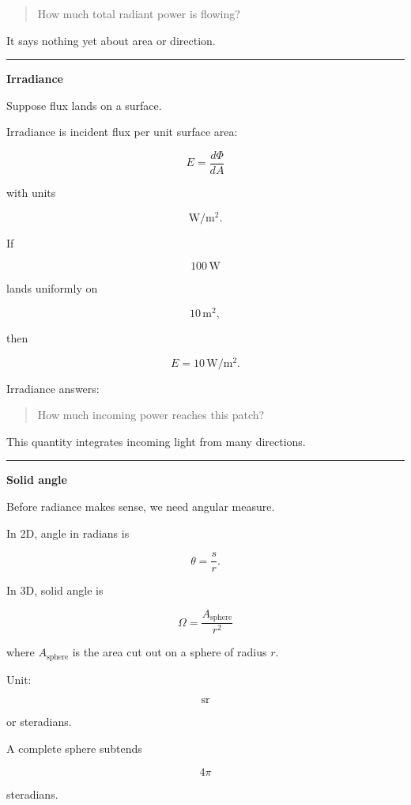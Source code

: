 \begin{quote}
How much total radiant power is flowing?
\end{quote}

It says nothing yet about area or direction.

\begin{center}\rule{0.5\linewidth}{0.5pt}\end{center}

\textbf{Irradiance}

Suppose flux lands on a surface.

Irradiance is incident flux per unit surface area:

\[
\boxed{
E=\frac{d\Phi}{dA}
}
\]

with units

\[
\mathrm{W/m^2}.
\]

If

\[
100\,\mathrm W
\]

lands uniformly on

\[
10\,\mathrm{m^2},
\]

then

\[
E=10\,\mathrm{W/m^2}.
\]

Irradiance answers:

\begin{quote}
How much incoming power reaches this patch?
\end{quote}

This quantity integrates incoming light from many directions.

\begin{center}\rule{0.5\linewidth}{0.5pt}\end{center}

\textbf{Solid angle}

Before radiance makes sense, we need angular measure.

In 2D, angle in radians is

\[
\theta=\frac{s}{r}.
\]

In 3D, solid angle is

\[
\boxed{
\Omega=\frac{A_{\text{sphere}}}{r^2}
}
\]

where \(A_{\text{sphere}}\) is the area cut out on a sphere of radius \(r\).

Unit:

\[
\mathrm{sr}
\]

or steradians.

A complete sphere subtends

\[
4\pi
\]

steradians.

